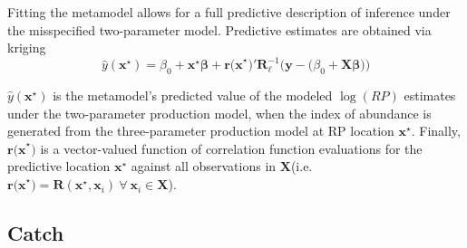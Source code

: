 %
Fitting the metamodel allows for a full predictive description of inference
under the misspecified two-parameter model.
Predictive estimates are obtained via kriging \cite{cressie_statistics_2015} %
\begin{equation} \label{gpYHat} %
        \hat y(\textbf{x}^\star) = \beta_0 + \textbf{x}^\star\bm{\beta} + \textbf{r(x}^\star\textbf{)}'\bm{R}^{-1}_{\bm{\ell}}\Big(\textbf{y}-\big(\beta_0+\bm{X}\bm{\beta}\big)\Big)
\end{equation}

%
$\hat y(\textbf{x}^\star)$ is the metamodel's predicted value of the modeled $\log(RP)$ estimates %
under the two-parameter production model, when the index of abundance %
is generated from the three-parameter production model at RP location $\textbf{x}^\star$.
Finally, $\textbf{r(x}^\star\textbf{)}$ is a vector-valued function of correlation function 
evaluations for the predictive location $\textbf{x}^\star$ against all observations 
in $\bm{X}$(i.e. $\textbf{r(x}^\star\textbf{)}=\bm{R}(\textbf{x}^\star, \bm{x}_i)~\forall~\bm{x}_i\in\bm{X}$).


%
\subsection{Catch \label{catch}}

